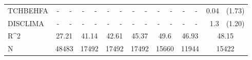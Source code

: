 \documentclass[10pt]{article}
\begin{document}
\begin{table}[htbp]
\begin{tabular}{lrlrlrlrlrlrlrl}
TCHBEHFA & \multicolumn{1}{c}{-} & \multicolumn{1}{c}{-} & \multicolumn{1}{c}{-} & \multicolumn{1}{c}{-} & \multicolumn{1}{c}{-} & \multicolumn{1}{c}{-} & \multicolumn{1}{c}{-} & \multicolumn{1}{c}{-} & \multicolumn{1}{c}{-} & \multicolumn{1}{c}{-} & \multicolumn{1}{c}{-} & \multicolumn{1}{c}{-} & 0.04  & (1.73) \\[0.2em]
DISCLIMA & \multicolumn{1}{c}{-} & \multicolumn{1}{c}{-} & \multicolumn{1}{c}{-} & \multicolumn{1}{c}{-} & \multicolumn{1}{c}{-} & \multicolumn{1}{c}{-} & \multicolumn{1}{c}{-} & \multicolumn{1}{c}{-} & \multicolumn{1}{c}{-} & \multicolumn{1}{c}{-} & \multicolumn{1}{c}{-} & \multicolumn{1}{c}{-} & 1.3   & (1.20) \\[0.2em]

    R^{2}   & \multicolumn{2}{c}{27.21} & \multicolumn{2}{c}{41.14} & \multicolumn{2}{c}{42.61} & \multicolumn{2}{c}{45.37} & \multicolumn{2}{c}{49.6} & \multicolumn{2}{c}{46.93} & \multicolumn{2}{c}{48.15} \\
    N     & \multicolumn{2}{c}{48483} & \multicolumn{2}{c}{17492} & \multicolumn{2}{c}{17492} & \multicolumn{2}{c}{17492} & \multicolumn{2}{c}{15660} & \multicolumn{2}{c}{11944} & \multicolumn{2}{c}{15422} \\
    
    \bottomrule
    \end{tabular}%
  \label{tab:addlabel}%
\end{table}%
\end{document}
